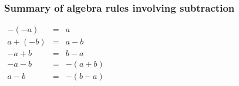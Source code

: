 \begin{frame}
\frametitle{Summary of algebra rules involving subtraction}


\begin{mathematicalRule}

\hfil\hfil $
\begin{array}{rcll|l}
-(-a)&=&a\\
a+(-b)&=& a-b\\
-a+b&=&b-a\\
-a-b&=&-(a+b)\\
a-b&=&-(b-a)
\end{array}
$
\end{mathematicalRule}
\end{frame}